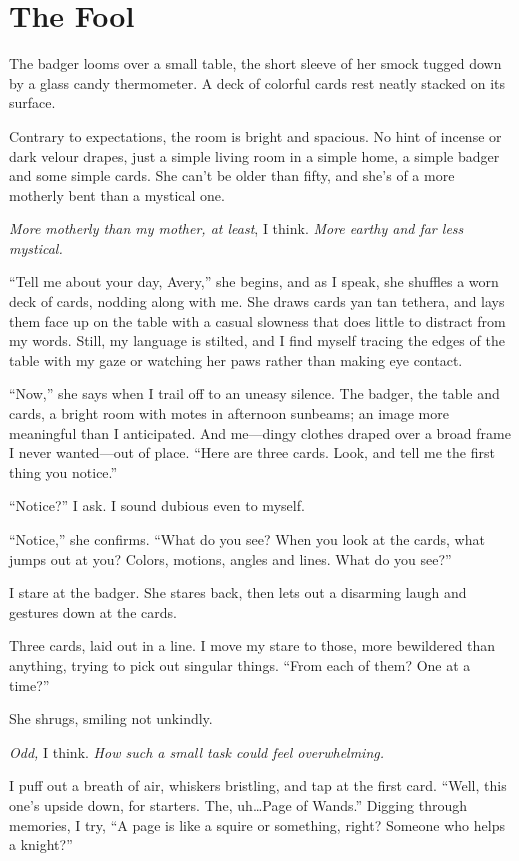 \hypertarget{the-fool}{%
\chapter{The Fool}\label{the-fool}}

The badger looms over a small table, the short sleeve of her smock tugged down by a glass candy thermometer. A deck of colorful cards rest neatly stacked on its surface.

Contrary to expectations, the room is bright and spacious. No hint of incense or dark velour drapes, just a simple living room in a simple home, a simple badger and some simple cards. She can't be older than fifty, and she's of a more motherly bent than a mystical one.

\emph{More motherly than my mother, at least}, I think. \emph{More earthy and far less mystical.}

``Tell me about your day, Avery,'' she begins, and as I speak, she shuffles a worn deck of cards, nodding along with me. She draws cards yan tan tethera, and lays them face up on the table with a casual slowness that does little to distract from my words. Still, my language is stilted, and I find myself tracing the edges of the table with my gaze or watching her paws rather than making eye contact.

``Now,'' she says when I trail off to an uneasy silence. The badger, the table and cards, a bright room with motes in afternoon sunbeams; an image more meaningful than I anticipated. And me---dingy clothes draped over a broad frame I never wanted---out of place. ``Here are three cards. Look, and tell me the first thing you notice.''

``Notice?'' I ask. I sound dubious even to myself.

``Notice,'' she confirms. ``What do you see? When you look at the cards, what jumps out at you? Colors, motions, angles and lines. What do you see?''

I stare at the badger. She stares back, then lets out a disarming laugh and gestures down at the cards.

Three cards, laid out in a line. I move my stare to those, more bewildered than anything, trying to pick out singular things. ``From each of them? One at a time?''

She shrugs, smiling not unkindly.

\emph{Odd,} I think. \emph{How such a small task could feel overwhelming.}

I puff out a breath of air, whiskers bristling, and tap at the first card. ``Well, this one's upside down, for starters. The, uh\ldots{}Page of Wands.'' Digging through memories, I try, ``A page is like a squire or something, right? Someone who helps a knight?''

